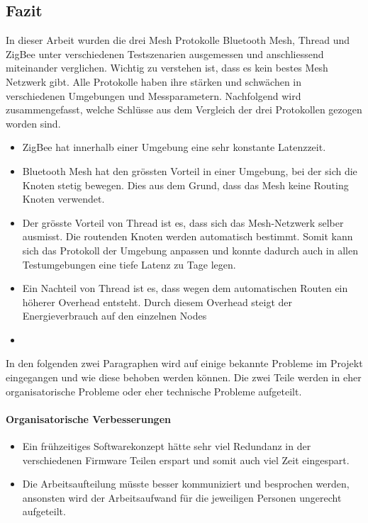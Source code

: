 \newpage
\subsection{Fazit}\label{subsec:Fazit}
In dieser Arbeit wurden die drei Mesh Protokolle Bluetooth Mesh, Thread und ZigBee unter verschiedenen Testszenarien ausgemessen und anschliessend miteinander verglichen. Wichtig zu verstehen ist, dass es kein bestes Mesh Netzwerk gibt. Alle Protokolle haben ihre stärken und schwächen in verschiedenen Umgebungen und Messparametern. Nachfolgend wird zusammengefasst, welche Schlüsse aus dem Vergleich der drei Protokollen gezogen worden sind.

\begin{itemize}
	\item ZigBee hat innerhalb einer Umgebung eine sehr konstante Latenzzeit.
	\item Bluetooth Mesh hat den grössten Vorteil in einer Umgebung, bei der sich die Knoten stetig bewegen. Dies aus dem Grund, dass das Mesh keine Routing Knoten verwendet.
	\item Der grösste Vorteil von Thread ist es, dass sich das Mesh-Netzwerk selber ausmisst. Die routenden Knoten werden automatisch bestimmt. Somit kann sich das Protokoll der Umgebung anpassen und konnte dadurch auch in allen Testumgebungen eine tiefe Latenz zu Tage legen.
	\item Ein Nachteil von Thread ist es, dass wegen dem automatischen Routen ein höherer Overhead entsteht. Durch diesem Overhead steigt der Energieverbrauch auf den einzelnen Nodes
	\item {}
\end{itemize}

In den folgenden zwei Paragraphen wird auf einige bekannte Probleme im Projekt eingegangen und wie diese behoben werden können. Die zwei Teile werden in eher organisatorische Probleme oder eher technische Probleme aufgeteilt.

\paragraph{Organisatorische Verbesserungen}\label{par:Organisatorische_Verbesserungen}
\begin{itemize}
	\item Ein frühzeitiges Softwarekonzept hätte sehr viel Redundanz in der verschiedenen Firmware Teilen erspart und somit auch viel Zeit eingespart.
	\item Die Arbeitsaufteilung müsste besser kommuniziert und besprochen werden, ansonsten wird der Arbeitsaufwand für die jeweiligen Personen ungerecht aufgeteilt.
\end{itemize}

